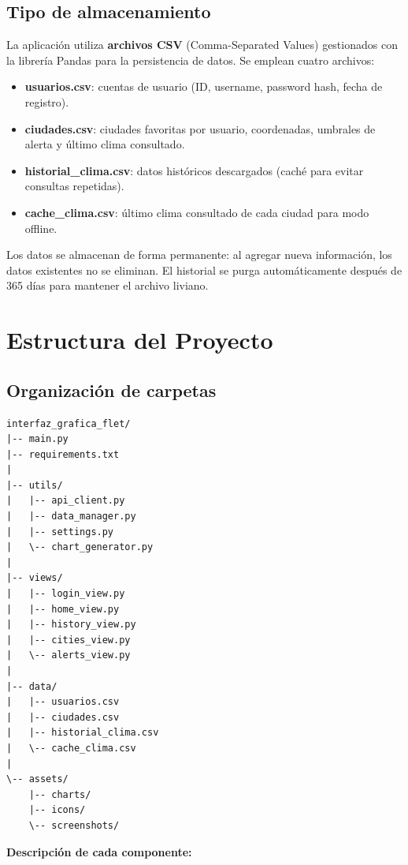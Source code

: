 \documentclass[12pt,a4paper]{article}
\begin{document}
\subsection{Tipo de almacenamiento}
La aplicación utiliza \textbf{archivos CSV} (Comma-Separated Values) gestionados con la librería Pandas para la persistencia de datos. Se emplean cuatro archivos:
\begin{itemize}
    \item \textbf{usuarios.csv}: cuentas de usuario (ID, username, password hash, fecha de registro).
    \item \textbf{ciudades.csv}: ciudades favoritas por usuario, coordenadas, umbrales de alerta y último clima consultado.
    \item \textbf{historial\_clima.csv}: datos históricos descargados (caché para evitar consultas repetidas).
    \item \textbf{cache\_clima.csv}: último clima consultado de cada ciudad para modo offline.
\end{itemize}
Los datos se almacenan de forma permanente: al agregar nueva información, los datos existentes no se eliminan. El historial se purga automáticamente después de 365 días para mantener el archivo liviano.
\section{Estructura del Proyecto}
\subsection{Organización de carpetas}

\begin{lstlisting}[frame=none, numbers=none, basicstyle=\ttfamily\footnotesize]
interfaz_grafica_flet/
|-- main.py
|-- requirements.txt
|
|-- utils/
|   |-- api_client.py
|   |-- data_manager.py
|   |-- settings.py
|   \-- chart_generator.py
|
|-- views/
|   |-- login_view.py
|   |-- home_view.py
|   |-- history_view.py
|   |-- cities_view.py
|   \-- alerts_view.py
|
|-- data/
|   |-- usuarios.csv
|   |-- ciudades.csv
|   |-- historial_clima.csv
|   \-- cache_clima.csv
|
\-- assets/
    |-- charts/
    |-- icons/
    \-- screenshots/
\end{lstlisting}

\vspace{0.3cm}
\noindent\textbf{Descripción de cada componente:}
\end{document}
